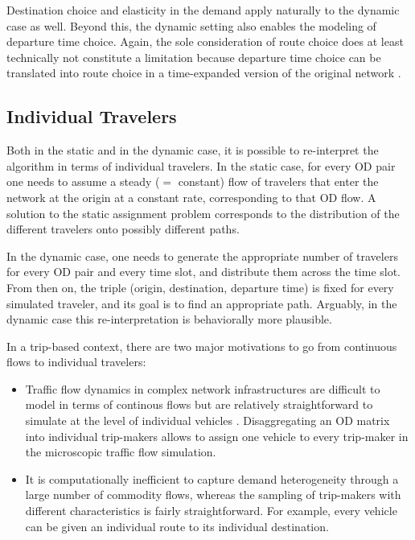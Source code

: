 Destination choice and elasticity in the demand apply naturally to 
the dynamic case as well. Beyond this, the dynamic setting also enables 
the modeling of departure time choice. Again, the sole consideration 
of route choice does at least technically not constitute a limitation 
because departure time choice can be translated into route choice in a 
time-expanded version of the original network \citep{vanderzijpp-2001}.


\subsection{Individual Travelers}
\label{sec:indiv-trav}

Both in the static and in the dynamic case, it is possible to
re-interpret the algorithm in terms of individual travelers.  
%
In the static case, for every OD pair one needs to
assume a steady ($=$ constant) flow of travelers that enter the
network at the origin at a constant rate, corresponding to that OD flow.
A solution to the static assignment problem corresponds to the
distribution of the different travelers onto possibly different paths.

In the dynamic case, one needs to generate the appropriate number of
travelers for every OD pair and every time slot, and distribute them
across the time slot.  From then on, the triple (origin, destination,
departure time) is fixed for every simulated traveler, and its goal is
to find an appropriate path.  
%
%
Arguably, in the dynamic case this re-interpretation is behaviorally
more plausible.

In a trip-based context, there are two major motivations to go from 
continuous flows to individual travelers:
\begin{itemize}

\item Traffic flow dynamics in complex network infrastructures are 
difficult to model in terms of continous flows 
\citep[e.g.,][]{floetteroed-2011a} but are relatively straightforward 
to simulate at the level of individual vehicles
\citep[][]{aimsun-www,paramics-www,transmodeler-www,vissim-www}. 
Disaggregating an OD matrix into individual trip-makers allows to 
assign one vehicle to every trip-maker in the microscopic traffic flow 
simulation.

\item It is computationally inefficient to capture demand heterogeneity 
through a large number of commodity flows, whereas the sampling of 
trip-makers with different characteristics is fairly straightforward. 
For example, every vehicle can be given an individual route to its individual 
destination.

\end{itemize}

